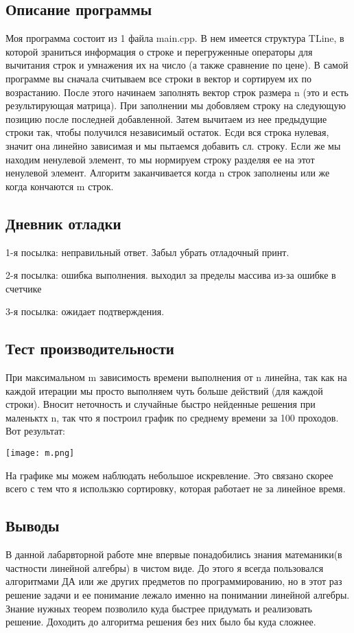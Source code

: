 \documentclass[12pt]{article}
\begin{document}
\subsection*{Описание программы}

Моя программа состоит из 1 файла main.cpp. В нем имеется структура TLine, в которой зраниться информация о строке и перегруженные операторы для вычитания строк и умнажения их на число (а также сравнение по цене). В самой программе вы сначала считываем все строки в вектор и сортируем их по возрастанию. После этого начинаем заполнять вектор строк размера n (это и есть результирующая матрица). При заполнении мы добовляем строку на следующую позицию после последней добавленной. Затем вычитаем из нее предыдущие строки так, чтобы получился независимый остаток. Есди вся строка нулевая, значит она линейно зависимая и мы пытаемся добавить сл. строку. Если же мы находим ненулевой элемент, то мы нормируем строку разделяя ее на этот ненулевой элемент. Алгоритм заканчивается когда n строк заполнены или же когда кончаются m строк.
\subsection*{Дневник отладки}

1-я посылка: неправильный ответ. Забыл убрать отладочный принт.

2-я посылка: ошибка выполнения. выходил за пределы массива из-за ошибке в счетчике

3-я посылка: ожидает подтверждения.
\subsection*{Тест производительности}
При максимальном m зависимость времени выполнения от n линейна, так как на каждой итерации мы просто выполняем чуть больше действий (для каждой строки). Вносит неточность и случайные быстро нейденные решения при маленьктх n, так что я построил график по среднему времени за 100 проходов. Вот результат:
 
\texttt{[image: m.png]}

На графике мы можем наблюдать небольшое искревление. Это связано скорее всего с тем что я использкю сортировку, которая работает не за линейное время.

\subsection*{Выводы}

В данной лабарвторной работе мне впервые понадобились знания матеманики(в частности линейной алгебры) в чистом виде. До этого я всегда пользовался алгоритмами ДА или же других предметов по программированию, но в этот раз решение задачи и ее понимание лежало именно на понимании линейной алгебры. Знание нужных теорем позволило куда быстрее придумать и реализовать решение. Доходить до алгоритма решения без них было бы куда сложнее.
\end{document}
